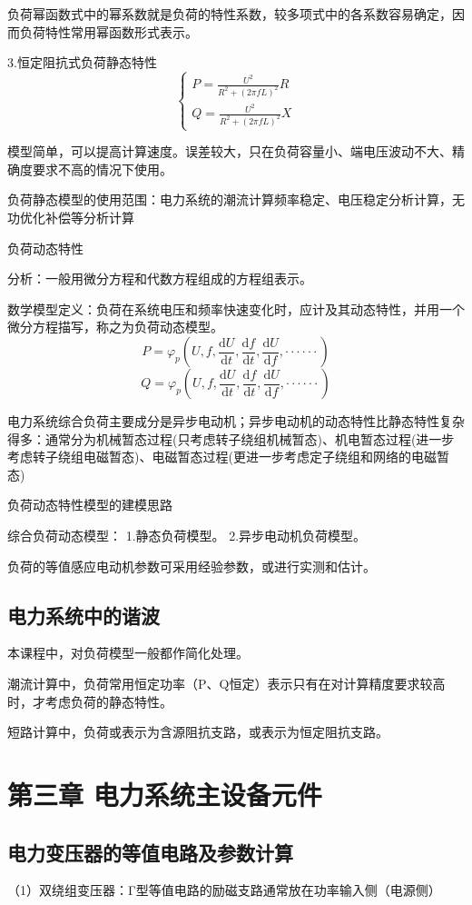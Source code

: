 \documentclass[UTF8, 12pt, a4paper]{ctexart}
\begin{document}
负荷幂函数式中的幂系数就是负荷的特性系数，较多项式中的各系数容易确定，因而负荷特性常用幂函数形式表示。

3.恒定阻抗式负荷静态特性
\[\begin{cases}
    P=\frac{U^2}{R^2+(2\pi fL)^2}R\\
    Q=\frac{U^2}{R^2+(2\pi fL)^2}X
\end{cases}\]

模型简单，可以提高计算速度。误差较大，只在负荷容量小、端电压波动不大、精确度要求不高的情况下使用。

负荷静态模型的使用范围：电力系统的潮流计算频率稳定、电压稳定分析计算，无功优化补偿等分析计算

负荷动态特性

分析：一般用微分方程和代数方程组成的方程组表示。

数学模型定义：负荷在系统电压和频率快速变化时，应计及其动态特性，并用一个微分方程描写，称之为负荷动态模型。
\[P=\varphi_p(U,f,\frac{\mathrm{d}U}{\mathrm{d}t},\frac{\mathrm{d}f}{\mathrm{d}t},\frac{\mathrm{d}U}{\mathrm{d}f},\cdot\cdot\cdot\cdot\cdot\cdot)\]
\[Q=\varphi_p(U,f,\frac{\mathrm{d}U}{\mathrm{d}t},\frac{\mathrm{d}f}{\mathrm{d}t},\frac{\mathrm{d}U}{\mathrm{d}f},\cdot\cdot\cdot\cdot\cdot\cdot{})\]

电力系统综合负荷主要成分是异步电动机；异步电动机的动态特性比静态特性复杂得多：通常分为机械暂态过程(只考虑转子绕组机械暂态)、机电暂态过程(进一步考虑转子绕组电磁暂态)、电磁暂态过程(更进一步考虑定子绕组和网络的电磁暂态)

负荷动态特性模型的建模思路

综合负荷动态模型：
1.静态负荷模型。
2.异步电动机负荷模型。

负荷的等值感应电动机参数可采用经验参数，或进行实测和估计。
\subsection{电力系统中的谐波}
本课程中，对负荷模型一般都作简化处理。

潮流计算中，负荷常用恒定功率（P、Q恒定）表示只有在对计算精度要求较高时，才考虑负荷的静态特性。

短路计算中，负荷或表示为含源阻抗支路，或表示为恒定阻抗支路。
\newpage{}
\section{第三章{} 电力系统主设备元件}
\subsection{电力变压器的等值电路及参数计算}
（1）双绕组变压器：Γ型等值电路的励磁支路通常放在功率输入侧（电源侧）
\end{document}
